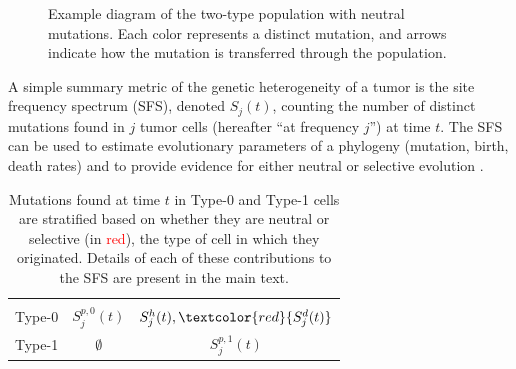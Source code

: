 \documentclass{article}
\numberwithin{equation}{section}
\newcommand{\red}[1]{\textcolor{red}{#1}}
\begin{document}
\begin{figure}[H]
    \centering
    \def\svgwidth{0.8\linewidth}
    
    \caption{Example diagram of the two-type population with neutral mutations. Each color represents a distinct mutation, and arrows indicate how the mutation is transferred through the population.}\label{fig:example_mutation}
\end{figure}

A simple summary metric of the genetic heterogeneity of a tumor is the site frequency spectrum (SFS), denoted $S_j(t)$, counting the number of distinct mutations found in $j$ tumor cells (hereafter ``at frequency $j$'') at time $t$. 
The SFS can be used to estimate evolutionary parameters of a phylogeny (mutation, birth, death rates) and to provide evidence for either neutral or selective evolution \cite{tung,gunnarsson2021,tanaka2023,gunnarsson2025}.



\begin{table}[H]
    \centering
    \begin{NiceTabular}{|w{c}{3cm}|c|c|}
\hline
{}&  &  \\[3ex]
\hline\hline \\[-2ex]
Type-0 & $S_j^{p,0}(t)$ & $S_j^h(t),\red{S_j^d(t)}$ \\[1ex]
Type-1 & $\emptyset$ & $S_j^{p,1}(t)$ \\[1ex] 
\hline 
\end{NiceTabular}
\caption{Mutations found at time $t$ in Type-0 and Type-1 cells are stratified based on whether they are neutral or selective (in \red{red}), the type of cell in which they originated. Details of each of these contributions to the SFS are present in the main text.}\label{table:SFS_components}
\end{table}
\end{document}
